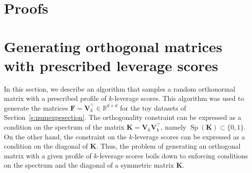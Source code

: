 \documentclass[twoside,11pt]{book}
\numberwithin{theorem}{chapter}
\numberwithin{definition}{chapter}
\numberwithin{proposition}{chapter}
\numberwithin{corollary}{chapter}
\numberwithin{example}{chapter}
\numberwithin{lemma}{chapter}
\DeclareMathOperator{\Sp}{\mathrm{Sp}}
\DeclareMathOperator{\Tran}{\intercal}
\begin{document}
\section{Proofs}
\label{app:proofs}


\section{Generating orthogonal matrices with prescribed leverage scores}
\label{app:framebuilding}


In this section, we describe an algorithm that samples a random orthonormal matrix with a prescribed profile of $k$-leverage scores. This algorithm was used to generate the matrices $\bm{F} = \bm{V}_{k}^{\Tran} \in \mathbb{R}^{k \times d}$ for the toy datasets of Section~\ref{s:numexpesection}. The orthogonality constraint can be expressed as a condition on the spectrum of the matrix $\bm{K} = \bm{V}_{k}^{}\bm{V}_{k}^{\Tran}$, namely $\Sp(\bm{K}) \subset \{0,1\}$. On the other hand, the constraint on the $k$-leverage scores can be expressed as a condition on the diagonal of $\bm{K}$. Thus, the problem of generating an orthogonal matrix with a given profile of $k$-leverage scores boils down to enforcing conditions on the spectrum and the diagonal of a symmetric matrix $\bm{K}$.
\end{document}
